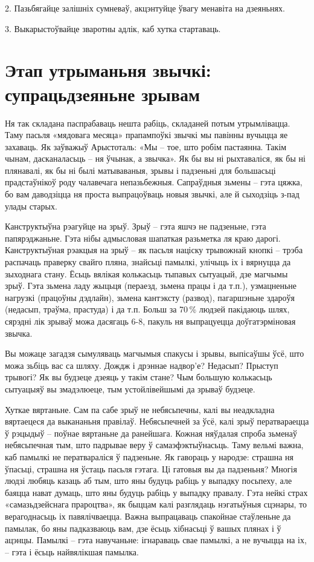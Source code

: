 2. Пазьбягайце залішніх сумневаў, акцэнтуйце ўвагу менавіта на дзеяньнях.

3. Выкарыстоўвайце зваротны адлік, каб хутка стартаваць.


\section{Этап утрыманьня звычкі: супрацьдзеяньне зрывам}

Ня так складана паспрабаваць нешта рабіць, складаней потым утрымлівацца. Таму пасьля «мядовага месяца» прапампоўкі звычкі мы павінны вучыцца яе захаваць. Як заўважыў Арыстоталь: «Мы – тое, што робім пастаянна. Такім чынам, дасканаласьць – ня ўчынак, а звычка». Як бы вы ні рыхтаваліся, як бы ні плянавалі, як бы ні былі матываваныя, зрывы і падзеньні для большасьці прадстаўнікоў роду чалавечага непазьбежныя. Сапраўдныя зьмены – гэта цяжка, бо вам даводзіцца ня проста выпрацоўваць новыя звычкі, але й сыходзіць з-пад улады старых.

Канструктыўна рэагуйце на зрыў. Зрыў – гэта яшчэ не падзеньне, гэта папярэджаньне. Гэта нібы адмысловая шапаткая разьметка ля краю дарогі. Канструктыўная рэакцыя на зрыў – як пасьля націску трывожнай кнопкі – трэба распачаць праверку свайго пляна, знайсьці памылкі, улічыць іх і вярнуцца да зыходнага стану. Ёсьць вялікая колькасьць тыпавых сытуацый, дзе магчымы зрыў. Гэта зьмена ладу жыцьця (пераезд, зьмена працы і да т.п.), узмацненьне нагрузкі (працоўны дэдлайн), зьмена кантэксту (развод), пагаршэньне здароўя (недасып, траўма, прастуда) і да т.п. Больш за 70\,\% людзей пакідаюць шлях, сярэдні лік зрываў можа дасягаць 6-8, пакуль ня выпрацуецца доўгатэрміновая звычка.

Вы можаце загадзя сымуляваць магчымыя спакусы і зрывы, выпісаўшы ўсё, што можа зьбіць вас са шляху. Дождж і дрэннае надвор'е? Недасып? Прыступ трывогі? Як вы будзеце дзеяць у такім стане? Чым большую колькасьць сытуацыяў вы змадэлюеце, тым устойлівейшымі да зрываў будзеце.

Хуткае вяртаньне. Сам па сабе зрыў не небясьпечны, калі вы неадкладна вяртаецеся да выкананьня правілаў. Небясьпечней за ўсё, калі зрыў ператвараецца ў рэцыдыў – поўнае вяртаньне да ранейшага. Кожная няўдалая спроба зьменаў небясьпечная тым, што падрывае веру ў самаэфэктыўнасьць. Таму вельмі важна, каб памылкі не ператвараліся ў падзеньне. Як гавораць у народзе: страшна ня ўпасьці, страшна ня ўстаць пасьля гэтага. Ці гатовыя вы да падзеньня? Многія людзі любяць казаць аб тым, што яны будуць рабіць у выпадку посьпеху, але баяцца нават думаць, што яны будуць рабіць у выпадку правалу. Гэта нейкі страх «самазьдзейснага прароцтва», як быццам калі разглядаць нэгатыўныя сцэнары, то верагоднасьць іх павялічваецца. Важна выпрацаваць спакойнае стаўленьне да памылак, бо яны падказваюць вам, дзе ёсьць хібнасьці ў вашых плянах і ў ацэнцы. Памылкі – гэта навучаньне: ігнараваць свае памылкі, а не вучыцца на іх, – гэта і ёсьць найвялікшая памылка.

